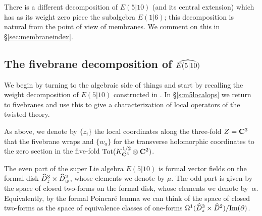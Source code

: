 There is a different decomposition of $E(5|10)$ (and its central extension) which has as its weight zero piece the subalgebra $E(1|6)$; this decomposition is natural from the point of view of membranes.
We comment on this in \S \ref{sec:membraneindex}.

\subsection{The fivebrane decomposition of $\Hat{E(5|10)}$}


We begin by turning to the algebraic side of things and start by recalling the weight decomposition of $E(5|10)$ constructed in \cite{KR2}.
In \S \ref{s:m5localops} we return to fivebranes and use this to give a  characterization of local operators of the twisted theory.

\parsec[s:e510weight]

As above, we denote by $\{z_i\}$ the local coordinates along the three-fold $Z=\C^3$ that the fivebrane wraps and $\{w_a\}$ for the transverse holomorphic coordinates to the zero section in the five-fold ${\rm Tot}(K_{\C^3}^{1/2} \otimes \C^2)$.

The even part of the super Lie algebra $E(5|10)$ is formal vector fields on the formal disk $\Hat{D}^3_z \times \Hat{D}^2_w$, whose elements we denote by $\mu$. 
The odd part is given by the space of closed two-forms on the formal disk, whose elements we denote by~$\alpha$.
Equivalently, by the formal Poincar\'e lemma we can think of the space of closed two-forms as the space of equivalence classes of one-forms $\Omega^1(\Hat{D}^3_z \times \Hat{D}^2) / \text{Im}(\del)$. 

